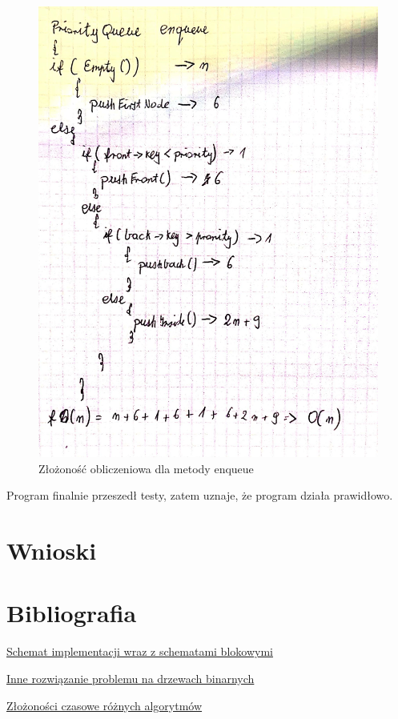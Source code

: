 \documentclass{article}
\begin{document}
\begin{figure}[H]
    \centering
    \hspace*{-1cm}
    \includegraphics[totalheight=8cm]{zlozonosc.jpg}
    \caption{Złożoność obliczeniowa dla metody enqueue}
    \label{2}
\end{figure}


Program finalnie przeszedł testy, zatem uznaje, że program działa prawidłowo.

\section{Wnioski}
\section{Bibliografia}
\href{https://eduinf.waw.pl/inf/alg/001_search/0106.php}{Schemat implementacji wraz z schematami blokowymi}

\href{https://bradfieldcs.com/algos/trees/priority-queues-with-binary-heaps/}{Inne rozwiązanie problemu na drzewach binarnych}

\href{https://www.hackerearth.com/practice/notes/heaps-and-priority-queues/}{Złożoności czasowe różnych algorytmów}
\end{document}
